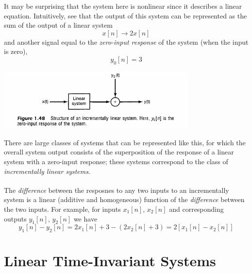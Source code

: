 \documentclass{report}
\begin{document}
It may be surprising that the system here is nonlinear since it describes a linear equation. Intuitively, see that the output
of this system can be represented as the sum of the output of a linear system
\begin{equation*}
x[n]\to2x[n]
\end{equation*}
and another signal equal to the \textit{zero-input
response} of the system (when the input is zero), 
\begin{equation*}
y_0[n]=3
\end{equation*}
\begin{center}
\includegraphics[width=10cm]{a15}
\end{center}
There are large classes of systems that can be represented like this, for which the overall system output
consists of the superposition of the response of a linear system with a zero-input response; these systems correspond to the class
of \textit{incrementally linear systems}.\\
\vspace{1mm}\\
The \textit{difference} between the resposnes to any two inputs to an incrementally system is a 
linear (additive and homogeneous) function of the \textit{difference} between the two inputs. For example, for inputs $x_1[n]$, 
$x_2[n]$ and corresponding outputs $y_1[n]$, $y_2[n]$ we have
\begin{equation*}
y_1[n]-y_2[n]=2x_1[n]+3-(2x_2[n]+3)=2[x_1[n]-x_2[n]]
\end{equation*}
\newpage

\chapter{Linear Time-Invariant Systems}
\end{document}
